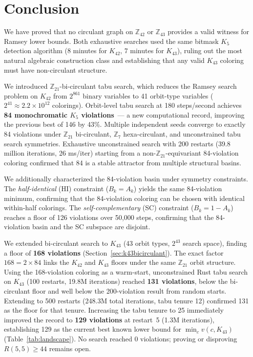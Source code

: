 \documentclass[11pt]{article}
\begin{document}
\section{Conclusion}

We have proved that no circulant graph on $\mathbb{Z}_{42}$ or $\mathbb{Z}_{43}$
provides a valid witness for Ramsey lower bounds. Both exhaustive searches used
the same bitmask $K_5$ detection algorithm (8 minutes for $K_{42}$, 7 minutes
for $K_{43}$), ruling out the most natural algebraic construction class and
establishing that any valid $K_{43}$ coloring must have non-circulant structure.

We introduced $\mathbb{Z}_{21}$-bi-circulant tabu search, which reduces the
Ramsey search problem on $K_{42}$ from $2^{861}$ binary variables to
41 orbit-type variables ($2^{41} \approx 2.2\times 10^{12}$ colorings).
Orbit-level tabu search at 180 steps/second achieves
\textbf{84 monochromatic $K_5$ violations}~--- a new computational record,
improving the previous best of 146 by 43\%.
Multiple independent seeds converge to exactly 84 violations under
$\mathbb{Z}_{21}$ bi-circulant, $\mathbb{Z}_7$ hexa-circulant, and unconstrained
tabu search symmetries. Exhaustive unconstrained search with 200 restarts
(39.8 million iterations, 26 ms/iter) starting from a non-$\mathbb{Z}_{21}$-equivariant
84-violation coloring confirmed that 84 is a stable attractor from multiple
structural basins.

We additionally characterized the 84-violation basin under symmetry constraints.
The \emph{half-identical} (HI) constraint ($B_k = A_k$) yields the same 84-violation minimum,
confirming that the 84-violation coloring can be chosen with identical within-half colorings.
The \emph{self-complementary} (SC) constraint ($B_k = 1-A_k$) reaches a floor of 126 violations
over 50,000 steps, confirming that the 84-violation basin and the SC subspace are disjoint.

We extended bi-circulant search to $K_{43}$ (43 orbit types, $2^{43}$ search space),
finding a floor of \textbf{168 violations} (Section~\ref{sec:k43bicirculant}).
The exact factor $168 = 2 \times 84$ links the $K_{42}$ and $K_{43}$ floors
under the same $\mathbb{Z}_{21}$ orbit structure.
Using the 168-violation coloring as a warm-start, unconstrained Rust tabu search
on $K_{43}$ (100 restarts, 19.8M iterations) reached \textbf{131 violations},
below the bi-circulant floor and well below the 200-violation result from random starts.
Extending to 500 restarts (248.3M total iterations, tabu tenure 12) confirmed 131 as the
floor for that tenure. Increasing the tabu tenure to 25 immediately improved the record to
\textbf{129 violations} at restart~5 (1.3M iterations),
establishing 129 as the current best known lower bound for $\min_c v(c, K_{43})$
(Table~\ref{tab:landscape}).
No search reached 0 violations; proving or disproving $R(5,5) \geq 44$ remains open.
\end{document}
